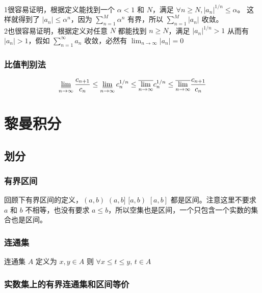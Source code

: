 1很容易证明，根据定义能找到一个 $ \alpha < 1 $ 和 $N$，满足 $\forall n \ge N, \lvert a_n \rvert ^{1/n} \le \alpha $。
这样就得到了 $\lvert a_n \rvert \le \alpha ^n$，因为 $\sum_{n=1}^{M}\alpha^n$ 有界，所以 $\sum_{n=1}^{M}\lvert a_n \rvert $ 收敛。 \\

2也很容易证明，根据定义对任意 $N$ 都能找到 $n \ge N$，满足 $\lvert a_n \rvert ^{1/n} > 1$ 从而有 $\lvert a_n \rvert > 1$，假如 $\sum_{n=1}^{\infty}a_n$ 收敛，必然有 $\lim_{n \to \infty}\lvert a_n \rvert = 0$


\subsubsection{比值判别法}

\begin{align*}
\varliminf_{n \to \infty}\frac{c_{n+1}}{c_n} \le \varliminf_{n \to \infty} c_n ^{1/n} \le \overline{\lim_{n \to \infty}} c_n ^{1/n} \le \overline{\lim_{n \to \infty}} \frac{c_{n+1}}{c_n}
\end{align*}

\section{黎曼积分}

\subsection{划分}

\subsubsection{有界区间}

回顾下有界区间的定义，$(a,b) \,\, (a,b] \,\, [a,b) \,\, [a,b]$ 都是区间。注意这里不要求 $a$ 和 $b$ 不相等，也没有要求 $a \le b$，所以空集也是区间，一个只包含一个实数的集合也是区间。

\subsubsection{连通集}

连通集 $A$ 定义为 $x, y \in A$ 则 $\forall x \le t \le y, \, t \in A$ 

\subsubsection{实数集上的有界连通集和区间等价}

